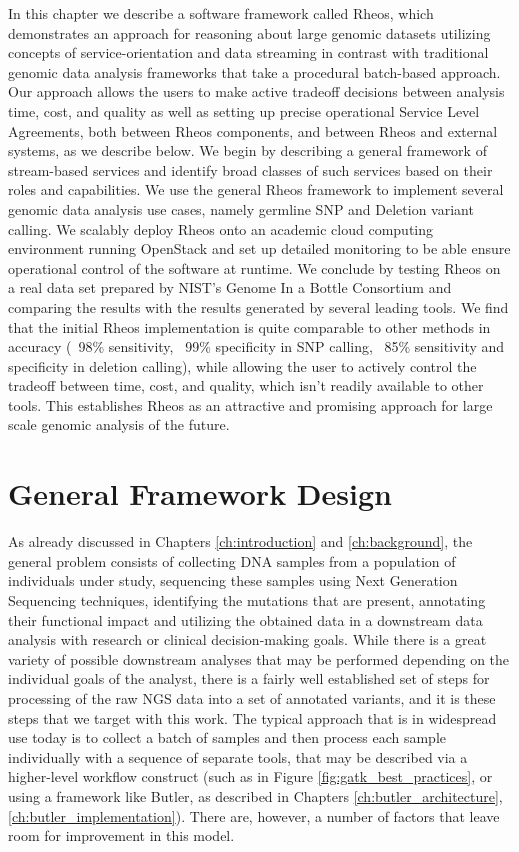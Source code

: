 In this chapter we describe a software framework called Rheos, which demonstrates an approach for reasoning about large genomic datasets utilizing concepts of service-orientation and data streaming in contrast with traditional genomic data analysis frameworks\autocite{depristo2011framework} that take a procedural batch-based approach. Our approach allows the users to make active tradeoff decisions between analysis time, cost, and quality as well as setting up precise operational Service Level Agreements, both between Rheos components, and between Rheos and external systems, as we describe below. We begin by describing a general framework of stream-based services and identify broad classes of such services based on their roles and capabilities. We use the general Rheos framework to implement several genomic data analysis use cases, namely germline SNP and Deletion variant calling. We scalably deploy Rheos onto an academic cloud computing environment running OpenStack and set up detailed monitoring to be able ensure operational control of the software at runtime. We conclude by testing Rheos on a real data set prepared by NIST's Genome In a Bottle Consortium and comparing the results with the results generated by several leading tools. We find that the initial Rheos implementation is quite comparable to other methods in accuracy (~98\% sensitivity, ~99\% specificity in SNP calling, ~85\% sensitivity and specificity in deletion calling), while allowing the user to actively control the tradeoff between time, cost, and quality, which isn't readily available to other tools. This establishes Rheos as an attractive and promising approach for large scale genomic analysis of the future. 

\section{General Framework Design}\label{sec:rheos_general_framework_design}

As already discussed in Chapters \ref{ch:introduction} and \ref{ch:background}, the general problem consists of collecting DNA samples from a population of individuals under study, sequencing these samples using Next Generation Sequencing techniques, identifying the mutations that are present, annotating their functional impact and utilizing the obtained data in a downstream data analysis with research or clinical decision-making goals. While there is a great variety of possible downstream analyses that may be performed depending on the individual goals of the analyst, there is a fairly well established set of steps for processing of the raw NGS data into a set of annotated variants, and it is these steps that we target with this work. The typical approach that is in widespread use today is to collect a batch of samples and then process each sample individually with a sequence of separate tools, that may be described via a higher-level workflow construct (such as in Figure \ref{fig:gatk_best_practices}, or using a framework like Butler, as described in Chapters \ref{ch:butler_architecture}, \ref{ch:butler_implementation}). There are, however, a number of factors that leave room for improvement in this model. 

